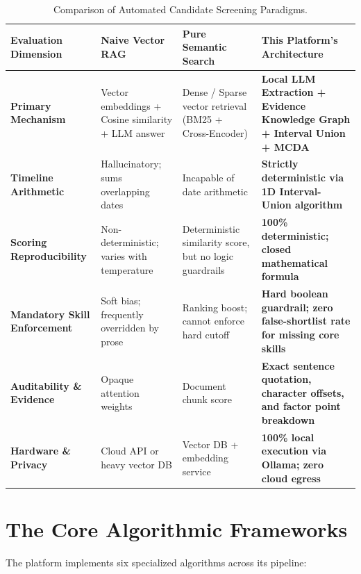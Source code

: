\documentclass[11pt,a4paper]{report}
\begin{document}
\begin{table}[htbp]
\centering
\small
\begin{tabularx}{\textwidth}{l p{3.2cm} p{3.2cm} X}
\toprule
\textbf{Evaluation Dimension} & \textbf{Naive Vector RAG} & \textbf{Pure Semantic Search} & \textbf{This Platform's Architecture} \\
\midrule
\textbf{Primary Mechanism} & Vector embeddings + Cosine similarity + LLM answer & Dense / Sparse vector retrieval (BM25 + Cross-Encoder) & \textbf{Local LLM Extraction + Evidence Knowledge Graph + Interval Union + MCDA} \\
\midrule
\textbf{Timeline Arithmetic} & Hallucinatory; sums overlapping dates & Incapable of date arithmetic & \textbf{Strictly deterministic via 1D Interval-Union algorithm} \\
\midrule
\textbf{Scoring Reproducibility} & Non-deterministic; varies with temperature & Deterministic similarity score, but no logic guardrails & \textbf{100\% deterministic; closed mathematical formula} \\
\midrule
\textbf{Mandatory Skill Enforcement} & Soft bias; frequently overridden by prose & Ranking boost; cannot enforce hard cutoff & \textbf{Hard boolean guardrail; zero false-shortlist rate for missing core skills} \\
\midrule
\textbf{Auditability \& Evidence} & Opaque attention weights & Document chunk score & \textbf{Exact sentence quotation, character offsets, and factor point breakdown} \\
\midrule
\textbf{Hardware \& Privacy} & Cloud API or heavy vector DB & Vector DB + embedding service & \textbf{100\% local execution via Ollama; zero cloud egress} \\
\bottomrule
\end{tabularx}
\caption{Comparison of Automated Candidate Screening Paradigms.}
\label{tab:algo_comparison}
\end{table}

\section{The Core Algorithmic Frameworks}

The platform implements six specialized algorithms across its pipeline:
\end{document}
